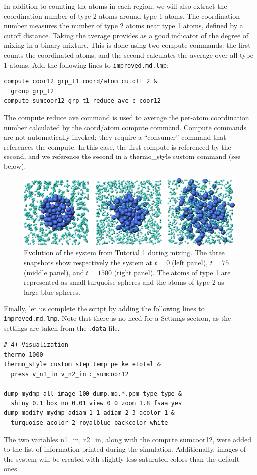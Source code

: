 \documentclass[9pt,tutorial]{livecoms}
\newcommand{\lmpcmd}[1]{\hspace{0pt}\colorbox{listing}{\textcolor{command}{\small{#1}}}\hspace{0pt}} %
\newcommand{\flecmd}[1]{\textcolor{command}{\texttt{#1}}} %
\begin{document}
In addition to counting the atoms in each region, we will also extract
the coordination number of type 2 atoms around type 1 atoms.  The
coordination number measures the number of type 2 atoms near
type 1 atoms, defined by a cutoff distance.  Taking the average provides
as a good indicator of the degree of mixing in a binary mixture.  This
is done using two \lmpcmd{compute} commands:  the first counts the
coordinated atoms, and the second calculates the average over all type 1
atoms.  Add the following lines to \flecmd{improved.md.lmp}:
\begin{lstlisting}
compute coor12 grp_t1 coord/atom cutoff 2 &
  group grp_t2
compute sumcoor12 grp_t1 reduce ave c_coor12
\end{lstlisting}
The \lmpcmd{compute reduce ave} command is used to average the per-atom
coordination number calculated by the \lmpcmd{coord/atom}
compute command.  Compute commands are not automatically invoked; they
require a ``consumer'' command that references the compute.  In this case, the
first compute is referenced by the second, and we reference the second
in a \lmpcmd{thermo\_style custom} command (see below).

\begin{figure}
\centering
\includegraphics[width=\linewidth]{LJ-evolution}
\caption{Evolution of the system from \hyperref[lennard-jones-label]{Tutorial 1}
during mixing.  The three snapshots show respectively the system
at $t=0$ (left panel), $t=75$ (middle panel), and $t=1500$ (right panel).  The
atoms of type 1 are represented as small turquoise spheres and the atoms of type 2
as large blue spheres.}
\label{fig:evolution-population}
\end{figure}

Finally, let us complete the script by adding the following lines to
\flecmd{improved.md.lmp}.  Note that there is no need for a \lmpcmd{Settings}
section, as the settings are taken from the \flecmd{.data} file.
\begin{lstlisting}
# 4) Visualization
thermo 1000
thermo_style custom step temp pe ke etotal &
  press v_n1_in v_n2_in c_sumcoor12

dump mydmp all image 100 dump.md.*.ppm type type &
  shiny 0.1 box no 0.01 view 0 0 zoom 1.8 fsaa yes
dump_modify mydmp adiam 1 1 adiam 2 3 acolor 1 &
  turquoise acolor 2 royalblue backcolor white
\end{lstlisting}
The two variables \lmpcmd{n1\_in}, \lmpcmd{n2\_in}, along with the compute
\lmpcmd{sumcoor12}, were added to the list of information printed during
the simulation. Additionally, images of the system will be created with
slightly less saturated colors than the default ones. 
\end{document}
